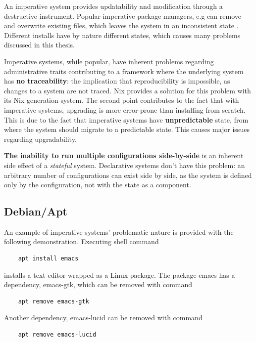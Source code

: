 An imperative system provides updatability and modification through a
destructive instrument. Popular imperative package managers, e.g can
remove and overwrite existing files, which leaves the system in an
inconsistent state \cite{dolstra2008nixos}. Different installs have by
nature different states, which causes many problems discussed in this
thesis.

Imperative systems, while popular, have inherent problems regarding
administrative traits contributing to a framework where the underlying
system has \textbf{no traceability}: the implication that
reproducibility is impossible, as changes to a system are not
traced. Nix provides a solution for this problem with its Nix
generation system. The second point contributes to the fact that with
imperative systems, upgrading is more error-prone than installing from
scratch. This is due to the fact that imperative systems have
\textbf{unpredictable} state, from where the system should migrate to
a predictable state. This causes major issues regarding
upgradability. \cite{dolstra2007purely}

\textbf{The inability to run multiple configurations side-by-side} is
an inherent side effect of a \textit{stateful} system. Declarative
systems don't have this problem: an arbitrary number of configurations
can exist side by side, as the system is defined only by the
configuration, not with the state as a
component. \cite{dolstra2007purely}

\subsection{Debian/Apt}

An example of imperative systems' problematic nature is provided with
the following demonstration. Executing shell command
\begin{lstlisting}
    apt install emacs
\end{lstlisting}
installs a text editor wrapped as a Linux package.  The package emacs
has a dependency, emacs-gtk, which can be removed with command
\begin{lstlisting}
    apt remove emacs-gtk
\end{lstlisting}
Another dependency, emacs-lucid can be removed with command
\begin{lstlisting}
    apt remove emacs-lucid
\end{lstlisting}

